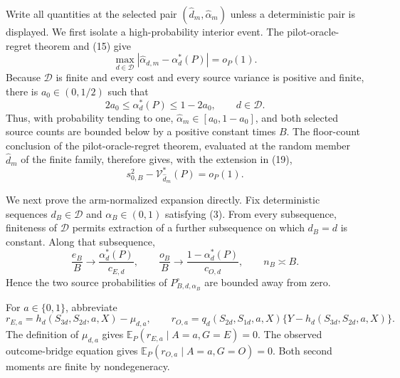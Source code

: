 Write all quantities at the selected pair \((\widehat d_m,\widehat\alpha_m)\) unless a deterministic pair is displayed.  We first isolate a high-probability interior event.  The pilot-oracle-regret theorem and (15) give
\[
 \max_{d\in\mathcal D}
 |\widehat\alpha_{d,m}-\alpha_d^*(P)|=o_P(1).                \tag{24}
\]
Because \(\mathcal D\) is finite and every cost and every source variance is positive and finite, there is \(a_0\in(0,1/2)\) such that
\[
 2a_0\le\alpha_d^*(P)\le1-2a_0,
 \qquad d\in\mathcal D.                                    \tag{25}
\]
Thus, with probability tending to one, \(\widehat\alpha_m\in[a_0,1-a_0]\), and both selected source counts are bounded below by a positive constant times \(B\).  The floor-count conclusion of the pilot-oracle-regret theorem, evaluated at the random member \(\widehat d_m\) of the finite family, therefore gives, with the extension in (19),
\[
 s_{0,B}^2-\mathcal V_{\widehat d_m}^*(P)=o_P(1).            \tag{26}
\]

We next prove the arm-normalized expansion directly.  Fix deterministic sequences \(d_B\in\mathcal D\) and \(\alpha_B\in(0,1)\) satisfying (3).  From every subsequence, finiteness of \(\mathcal D\) permits extraction of a further subsequence on which \(d_B=d\) is constant.  Along that subsequence,
\[
 \frac{e_B}{B}\longrightarrow\frac{\alpha_d^*(P)}{c_{E,d}},
 \qquad
 \frac{o_B}{B}\longrightarrow\frac{1-\alpha_d^*(P)}{c_{O,d}},
 \qquad n_B\asymp B.                                       \tag{27}
\]
Hence the two source probabilities of \(P_{B,d,\alpha_B}^{\circ}\) are bounded away from zero.

For \(a\in\{0,1\}\), abbreviate
\[
 r_{E,a}=h_d(S_{3d},S_{2d},a,X)-\mu_{d,a},
 \qquad
 r_{O,a}=q_d(S_{2d},S_{1d},a,X)
 \{Y-h_d(S_{3d},S_{2d},a,X)\}.                             \tag{28}
\]
The definition of \(\mu_{d,a}\) gives \(\mathbb E_P(r_{E,a}\mid A=a,G=E)=0\).  The observed outcome-bridge equation gives \(\mathbb E_P(r_{O,a}\mid A=a,G=O)=0\).  Both second moments are finite by nondegeneracy.

